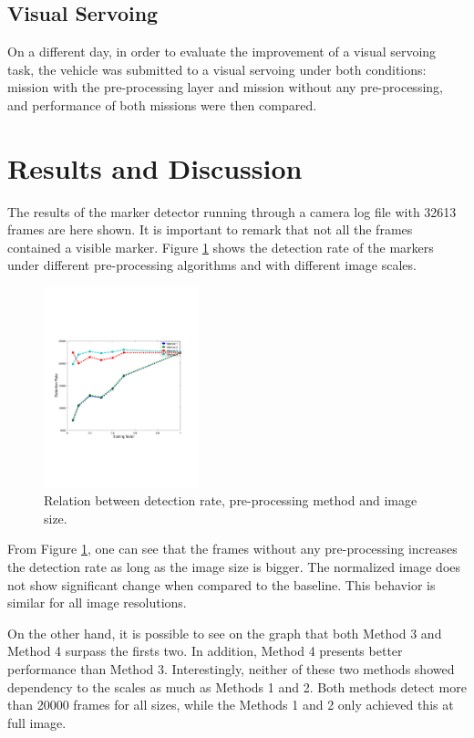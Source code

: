 \documentclass[conference, letterpaper]{IEEEtran}
\begin{document}
\subsection{Visual Servoing}

On a different day, in order to evaluate the improvement of a visual servoing
task, the vehicle was submitted to a visual servoing under both conditions:
mission with the pre-processing layer and mission without any pre-processing,
and performance of both missions were then compared.

\section{Results and Discussion} \label{sec:results}

The results of the marker detector running through a camera log file with 32613
frames are here shown. It is important to remark that not all the frames
contained a visible marker. Figure \ref{fig:detection_rate} shows the detection
rate of the markers under different pre-processing algorithms and with
different image scales. 

\begin{figure}[!ht]
	\centering
    \includegraphics[width=0.4\textwidth, trim={1.6cm 6.9cm 2.3cm 6.7cm}]{./fig/detection_rate_emb.pdf}
    \caption{Relation between detection rate, pre-processing method and image size.}
	\label{fig:detection_rate}
\end{figure}

From Figure \ref{fig:detection_rate}, one can see that the frames without any
pre-processing increases the detection rate as long as the image size is bigger.
The normalized image does not show significant change when compared to the
baseline. This behavior is similar for all image resolutions.

On the other hand, it is possible to see on the graph that both Method 3 and
Method 4 surpass the firsts two. In addition, Method 4 presents better performance
than Method 3. Interestingly, neither of these two methods showed dependency to
the scales as much as Methods 1 and 2. Both methods detect more than
20000 frames for all sizes, while the Methods 1 and 2 only achieved this at
full image. 
\end{document}
